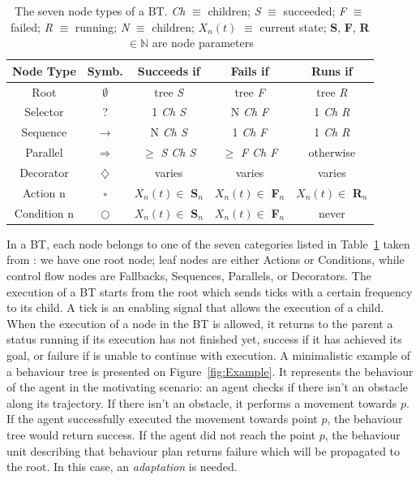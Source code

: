 \documentclass[journal]{IEEEtran}
\theoremstyle{definition}
\newcommand\patrizio[1]{\nb{Patrizio}{#1}}
\begin{document}
\begin{table}[h!]
\centering
 \begin{tabular}{||c c c c c||} 
 \hline
\textbf{Node Type} & \textbf{Symb.} & \textbf{Succeeds if} & \textbf{Fails if} & \textbf{Runs if} \\ [0.5ex] 
 \hline\hline
 Root & $\emptyset$ & tree \textit{S} & tree \textit{F} & tree \textit{R} \\ 
 \hline
 Selector & ? & 1 \textit{Ch S} & N \textit{Ch F} & 1 \textit{Ch R} \\
 \hline
 Sequence & $\longrightarrow$ & N \textit{Ch S} & 1 \textit{Ch F} & 1 \textit{Ch R}\\
 \hline
 Parallel & $\Longrightarrow$  & $\geq$ \textit{S Ch S} & $\geq$ \textit{F Ch F} & otherwise \\
 \hline
 Decorator & $\diamondsuit$ & varies & varies & varies \\ 
 \hline
  Action n & $\square$ & $X_n(t) \in$ \textbf{S}$_n$   & $X_n(t) \in$ \textbf{F}$_n$  & $X_n(t) \in$ \textbf{R}$_n$  \\
 \hline
Condition n & $\bigcirc$ & $X_n(t) \in$  \textbf{S}$_n$   & $X_n(t) \in$ \textbf{F}$_n$   & never \\
\hline
\end{tabular}
\caption{The seven node types of a BT. \textit{Ch} $\equiv$ children; \textit{S} $\equiv$ succeeded; \textit{F} $\equiv$ failed; \textit{R} $\equiv$ running; \textit{N} $\equiv$ children; $X_n(t)$ $\equiv$ current state;
\textbf{S}, \textbf{F}, \textbf{R} $\in \mathbb{N}$ are node parameters
\cite{marzinotto2014towards}} 
\label{tab:BTnodes}
\end{table}


In a BT, each node belongs to one of the seven categories listed in Table~\ref{tab:BTnodes} taken from \cite{marzinotto2014towards}: we have one root node; leaf nodes are either Actions or Conditions, while control flow nodes are Fallbacks, Sequences, Parallels, or Decorators.
The execution of a BT starts from the root which sends ticks with a certain frequency to its child. A tick is an enabling signal that allows the execution of a child. When the execution of a node in the BT is allowed, it returns to the parent a status running if its execution has not finished yet, success if it has achieved its goal, or failure if is unable to continue with execution. A minimalistic example of a behaviour tree is presented on Figure~\ref{fig:Example}. It represents the  behaviour of the agent in the motivating scenario: an agent checks if there isn't an obstacle along its trajectory. If there isn't an obstacle, it performs a movement towards $p$.
If the agent successfully executed the movement towards point $p$, the behaviour tree would return success. If the agent did not reach the point $p$, the behaviour unit describing that behaviour plan returns failure which will be propagated to the root. In this case, an \textit{adaptation}  is needed.
\end{document}
